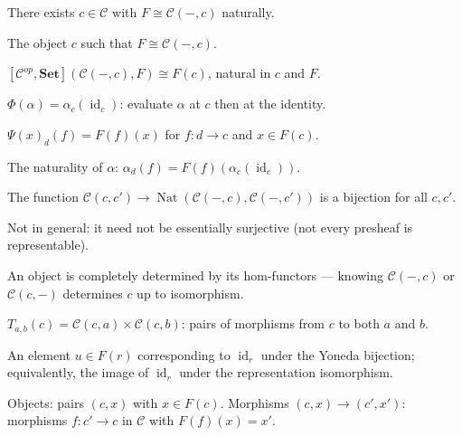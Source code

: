 \begin{exercisesbox}
\begin{qa}
       {There exists $c \in \mathcal{C}$ with $F \cong \mathcal{C}(-,c)$ naturally.}

       {The object $c$ such that $F \cong \mathcal{C}(-,c)$.}

       {$[\mathcal{C}^{op}, \mathbf{Set}](\mathcal{C}(-,c), F) \cong F(c)$,
        natural in $c$ and $F$.}

       {$\Phi(\alpha) = \alpha_c(\operatorname{id}_c)$: evaluate $\alpha$ at $c$
        then at the identity.}

       {$\Psi(x)_d(f) = F(f)(x)$ for $f : d \to c$ and $x \in F(c)$.}

       {The naturality of $\alpha$: $\alpha_d(f) = F(f)(\alpha_c(\operatorname{id}_c))$.}

       {The function $\mathcal{C}(c,c') \to \operatorname{Nat}(\mathcal{C}(-,c),\mathcal{C}(-,c'))$
        is a bijection for all $c, c'$.}

       {Not in general: it need not be essentially surjective (not every presheaf
        is representable).}

       {An object is completely determined by its hom-functors — knowing
        $\mathcal{C}(-,c)$ or $\mathcal{C}(c,-)$ determines $c$ up to isomorphism.}

       {$T_{a,b}(c) = \mathcal{C}(c,a) \times \mathcal{C}(c,b)$: pairs of
        morphisms from $c$ to both $a$ and $b$.}

       {An element $u \in F(r)$ corresponding to $\operatorname{id}_r$ under
        the Yoneda bijection; equivalently, the image of $\operatorname{id}_r$
        under the representation isomorphism.}

       {Objects: pairs $(c, x)$ with $x \in F(c)$. Morphisms $(c,x) \to (c',x')$:
        morphisms $f : c' \to c$ in $\mathcal{C}$ with $F(f)(x) = x'$.}


\end{qa}
\end{exercisesbox}
